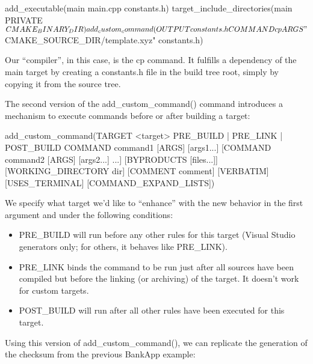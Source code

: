 
\begin{cmake}
add_executable(main main.cpp constants.h)
target_include_directories(main PRIVATE ${CMAKE_BINARY_DIR})
add_custom_command(OUTPUT constants.h COMMAND cp
                   ARGS "${CMAKE_SOURCE_DIR}/template.xyz" constants.h)
\end{cmake}

Our “compiler”, in this case, is the cp command. It fulfills a dependency of the main target by creating a constants.h file in the build tree root, simply by copying it from the source tree.


The second version of the add\_custom\_command() command introduces a mechanism to execute commands before or after building a target:

\begin{cmake}
add_custom_command(TARGET <target>
                   PRE_BUILD | PRE_LINK | POST_BUILD
                   COMMAND command1 [ARGS] [args1...]
                   [COMMAND command2 [ARGS] [args2...] ...]
                   [BYPRODUCTS [files...]]
                   [WORKING_DIRECTORY dir]
                   [COMMENT comment]
                   [VERBATIM] [USES_TERMINAL]
                   [COMMAND_EXPAND_LISTS])
\end{cmake}

We specify what target we’d like to “enhance” with the new behavior in the first argument and under the following conditions:

\begin{itemize}
\item
PRE\_BUILD will run before any other rules for this target (Visual Studio generators only; for others, it behaves like PRE\_LINK).

\item
PRE\_LINK binds the command to be run just after all sources have been compiled but before the linking (or archiving) of the target. It doesn’t work for custom targets.

\item
POST\_BUILD will run after all other rules have been executed for this target.
\end{itemize}

Using this version of add\_custom\_command(), we can replicate the generation of the checksum from the previous BankApp example:

